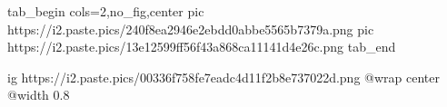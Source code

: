  
 
 
 
 
\qqSecCmtScr

\ifcmt
  tab_begin cols=2,no_fig,center
     pic https://i2.paste.pics/240f8ea2946e2ebdd0abbe5565b7379a.png
		 pic https://i2.paste.pics/13e12599ff56f43a868ca11141d4e26c.png
  tab_end
\fi

\ifcmt
  ig https://i2.paste.pics/00336f758fe7eadc4d11f2b8e737022d.png
  @wrap center
  @width 0.8
\fi
